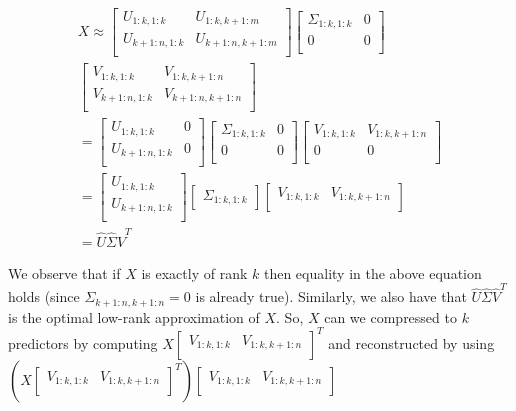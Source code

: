 \documentclass[conference]{IEEEtran}
\begin{document}
\begin{align*}
X \approx 
\begin{bmatrix}
U_{1:k,1:k} & U_{1:k,k+1:m} \\
U_{k+1:n,1:k} & U_{k+1:n,k+1:m} \\
\end{bmatrix}
\begin{bmatrix}
\Sigma_{1:k,1:k} & 0 \\
0 & 0 \\
\end{bmatrix}\\
\begin{bmatrix}
V_{1:k,1:k} & V_{1:k,k+1:n} \\
V_{k+1:n,1:k} & V_{k+1:n,k+1:n} \\
\end{bmatrix} \\
= 
\begin{bmatrix}
U_{1:k,1:k} & 0 \\
U_{k+1:n,1:k} & 0 \\
\end{bmatrix}
\begin{bmatrix}
\Sigma_{1:k,1:k} & 0 \\
0 & 0 \\
\end{bmatrix}
\begin{bmatrix}
V_{1:k,1:k} & V_{1:k,k+1:n} \\
0 & 0 \\
\end{bmatrix} \\
= 
\begin{bmatrix}
U_{1:k,1:k} \\
U_{k+1:n,1:k} \\
\end{bmatrix}
\begin{bmatrix}
\Sigma_{1:k,1:k}
\end{bmatrix}
\begin{bmatrix}
V_{1:k,1:k} & V_{1:k,k+1:n} \\
\end{bmatrix} \\
= \hat{U} \hat{\Sigma} \hat{V}^T
\end{align*}

We observe that if $X$ is exactly of rank $k$ then equality in the above equation holds (since $\Sigma_{k+1:n,k+1:n}=0$ is already true).  Similarly, we also have that $\hat{U} \hat{\Sigma} \hat{V}^T$ is the optimal low-rank approximation of $X$.  So, $X$ can we compressed to $k$ predictors by computing $X \begin{bmatrix} V_{1:k,1:k} & V_{1:k,k+1:n} \\ \end{bmatrix}^T$ and reconstructed by using $(X \begin{bmatrix} V_{1:k,1:k} & V_{1:k,k+1:n} \\ \end{bmatrix}^T) \begin{bmatrix} V_{1:k,1:k} & V_{1:k,k+1:n} \\ \end{bmatrix}$
\end{document}
